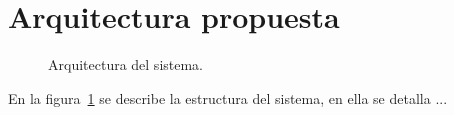 \section{Arquitectura propuesta}


\begin{figure}[htbp!]
	\begin{center}
		\caption{Arquitectura del sistema.}
		\label{fig:arquitectura}
	\end{center}
\end{figure}

En la figura~\ref{fig:arquitectura} se describe la estructura del sistema, en ella se detalla ...


